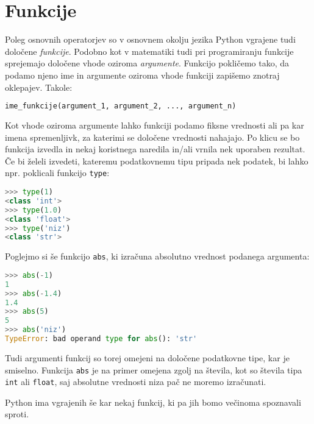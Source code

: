 \section{Funkcije}
Poleg osnovnih operatorjev so v osnovnem okolju jezika Python vgrajene tudi določene \emph{funkcije}. Podobno kot v matematiki tudi pri programiranju funkcije sprejemajo določene vhode oziroma \emph{argumente}. Funkcijo pokličemo tako, da podamo njeno ime in argumente oziroma vhode funkciji zapišemo znotraj oklepajev. Takole:
\begin{lstlisting}[language=Python]
ime_funkcije(argument_1, argument_2, ..., argument_n)
\end{lstlisting}
Kot vhode oziroma argumente lahko funkciji podamo fiksne vrednosti ali pa kar imena spremenljivk, za katerimi se določene vrednosti nahajajo. Po klicu se bo funkcija izvedla in nekaj koristnega naredila in/ali vrnila nek uporaben rezultat. Če bi želeli izvedeti, kateremu podatkovnemu tipu pripada nek podatek, bi lahko npr. poklicali funkcijo \texttt{type}:
\begin{lstlisting}[language=Python]
>>> type(1)
<class 'int'>
>>> type(1.0)
<class 'float'>
>>> type('niz')
<class 'str'>
\end{lstlisting}
Poglejmo si še funkcijo \texttt{abs}, ki izračuna absolutno vrednost podanega argumenta:
\begin{lstlisting}[language=Python]
>>> abs(-1)
1
>>> abs(-1.4)
1.4
>>> abs(5)
5
>>> abs('niz')
TypeError: bad operand type for abs(): 'str'
\end{lstlisting}
Tudi argumenti funkcij so torej omejeni na določene podatkovne tipe, kar je smiselno. Funkcija \texttt{abs} je na primer omejena zgolj na števila, kot so števila tipa \texttt{int} ali \texttt{float}, saj absolutne vrednosti niza pač ne moremo izračunati.

Python ima vgrajenih še kar nekaj funkcij, ki pa jih bomo večinoma spoznavali sproti. 

